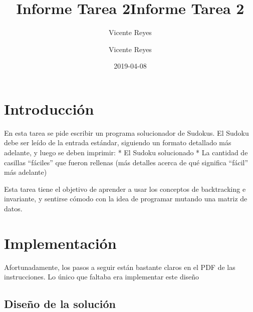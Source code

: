 \documentclass[
  spanish,
  a4paper,
,tablecaptionabove
]{scrartcl}
\title{Informe Tarea 2}
\author{Vicente Reyes}
\date{2019-04-08}
\title{Informe Tarea 2}
\author{Vicente Reyes}
\begin{document}

\begin{titlepage}
\newcommand{\colorRule}[3][black]{\textcolor[HTML]{#1}{\rule{#2}{#3}}}
\end{titlepage}
\restoregeometry




\hypertarget{introducciuxf3n}{%
\section{Introducción}\label{introducciuxf3n}}

En esta tarea se pide escribir un programa solucionador de Sudokus. El
Sudoku debe ser leído de la entrada estándar, siguiendo un formato
detallado más adelante, y luego se deben imprimir: * El Sudoku
solucionado * La cantidad de casillas \enquote{fáciles} que fueron
rellenas (más detalles acerca de qué significa \enquote{fácil} más
adelante)

Esta tarea tiene el objetivo de aprender a usar los conceptos de
backtracking e invariante, y sentirse cómodo con la idea de programar
mutando una matriz de datos.

\hypertarget{implementaciuxf3n}{%
\section{Implementación}\label{implementaciuxf3n}}

Afortunadamente, los pasos a seguir están bastante claros en el PDF de
las instrucciones. Lo único que faltaba era implementar este diseño

\hypertarget{diseuxf1o-de-la-soluciuxf3n}{%
\subsection{Diseño de la solución}\label{diseuxf1o-de-la-soluciuxf3n}}
\end{document}
